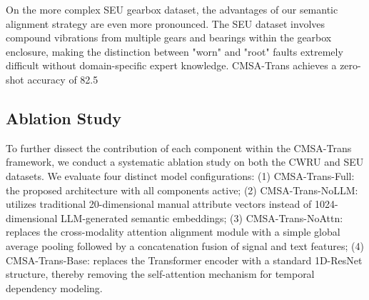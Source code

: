 On the more complex SEU gearbox dataset, the advantages of our semantic alignment strategy are even more pronounced. The SEU dataset involves compound vibrations from multiple gears and bearings within the gearbox enclosure, making the distinction between "worn" and "root" faults extremely difficult without domain-specific expert knowledge. CMSA-Trans achieves a zero-shot accuracy of 82.5%

\subsection{Ablation Study}
To further dissect the contribution of each component within the CMSA-Trans framework, we conduct a systematic ablation study on both the CWRU and SEU datasets. We evaluate four distinct model configurations: (1) CMSA-Trans-Full: the proposed architecture with all components active; (2) CMSA-Trans-NoLLM: utilizes traditional 20-dimensional manual attribute vectors instead of 1024-dimensional LLM-generated semantic embeddings; (3) CMSA-Trans-NoAttn: replaces the cross-modality attention alignment module with a simple global average pooling followed by a concatenation fusion of signal and text features; (4) CMSA-Trans-Base: replaces the Transformer encoder with a standard 1D-ResNet structure, thereby removing the self-attention mechanism for temporal dependency modeling.

